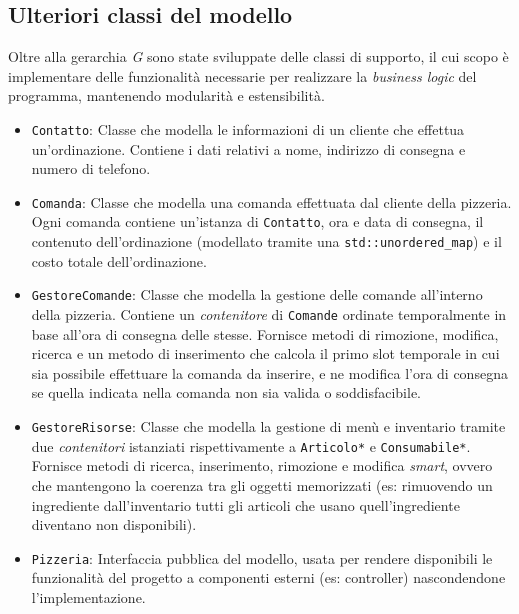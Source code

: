 \documentclass[
  10pt,
]{article}
\begin{document}
\newpage
\hypertarget{ulteriori-classi-del-modello}{%
\subsection{Ulteriori classi del
modello}\label{ulteriori-classi-del-modello}}

Oltre alla gerarchia \emph{G} sono state sviluppate delle classi di
supporto, il cui scopo è implementare delle funzionalità necessarie per
realizzare la \emph{business logic} del programma, mantenendo modularità
e estensibilità.

\begin{itemize}
\item
  \texttt{Contatto}: Classe che modella le informazioni di un cliente
  che effettua un'ordinazione. Contiene i dati relativi a nome,
  indirizzo di consegna e numero di telefono.
\item
  \texttt{Comanda}: Classe che modella una comanda effettuata dal
  cliente della pizzeria. Ogni comanda contiene un'istanza di
  \texttt{Contatto}, ora e data di consegna, il contenuto
  dell'ordinazione (modellato tramite una \texttt{std::unordered\_map})
  e il costo totale dell'ordinazione.
\item
  \texttt{GestoreComande}: Classe che modella la gestione delle comande
  all'interno della pizzeria. Contiene un \emph{contenitore} di
  \texttt{Comande} ordinate temporalmente in base all'ora di consegna
  delle stesse. Fornisce metodi di rimozione, modifica, ricerca e un
  metodo di inserimento che calcola il primo slot temporale in cui sia
  possibile effettuare la comanda da inserire, e ne modifica l'ora di
  consegna se quella indicata nella comanda non sia valida o
  soddisfacibile.
\item
  \texttt{GestoreRisorse}: Classe che modella la gestione di menù e
  inventario tramite due \emph{contenitori} istanziati rispettivamente a
  \texttt{Articolo*} e \texttt{Consumabile*}. Fornisce metodi di
  ricerca, inserimento, rimozione e modifica \emph{smart}, ovvero che
  mantengono la coerenza tra gli oggetti memorizzati (es: rimuovendo un
  ingrediente dall'inventario tutti gli articoli che usano
  quell'ingrediente diventano non disponibili).
\item
  \texttt{Pizzeria}: Interfaccia pubblica del modello, usata per rendere
  disponibili le funzionalità del progetto a componenti esterni (es:
  controller) nascondendone l'implementazione.
\end{itemize}
\end{document}
